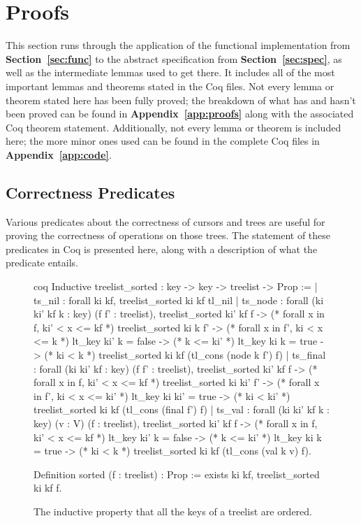 \documentclass[12pt]{article}
\begin{document}
\clearpage

\section{Proofs}
\label{sec:proofs}

This section runs through the application of the functional implementation from \textbf{Section~\ref{sec:func}} to the abstract specification from \textbf{Section~\ref{sec:spec}}, as well as the intermediate lemmas used to get there. It includes all of the most important lemmas and theorems stated in the Coq files. Not every lemma or theorem stated here has been fully proved; the breakdown of what has and hasn't been proved can be found in \textbf{Appendix~\ref{app:proofs}} along with the associated Coq theorem statement. Additionally, not every lemma or theorem is included here; the more minor ones used can be found in the complete Coq files in \textbf{Appendix~\ref{app:code}}.

\subsection{Correctness Predicates}

Various predicates about the correctness of cursors and trees are useful for proving the correctness of operations on those trees. The statement of these predicates in Coq is presented here, along with a description of what the predicate entails.

\begin{singlespace}
\begin{figure}[hpt]
\centering
\begin{cminted}{coq}
Inductive treelist_sorted : key -> key -> treelist -> Prop :=
| ts_nil : forall ki kf, treelist_sorted ki kf tl_nil
| ts_node : forall (ki ki' kf k : key) (f f' : treelist),
    treelist_sorted ki' kf f -> (* forall x in f, ki' < x <= kf *)
    treelist_sorted ki k f' -> (* forall x in f', ki < x <= k *)
    lt_key ki' k = false -> (* k <= ki' *)
    lt_key ki k = true -> (* ki < k *)
    treelist_sorted ki kf (tl_cons (node k f') f)
| ts_final : forall (ki ki' kf : key) (f f' : treelist),
    treelist_sorted ki' kf f -> (* forall x in f, ki' < x <= kf *)
    treelist_sorted ki ki' f' -> (* forall x in f', ki < x <= ki' *)
    lt_key ki ki' = true -> (* ki < ki' *)
    treelist_sorted ki kf (tl_cons (final f') f)
| ts_val : forall (ki ki' kf k : key) (v : V) (f : treelist),
    treelist_sorted ki' kf f -> (* forall x in f, ki' < x <= kf *)
    lt_key ki' k = false -> (* k <= ki' *)
    lt_key ki k = true -> (* ki < k *)
    treelist_sorted ki kf (tl_cons (val k v) f).

Definition sorted (f : treelist) : Prop :=
  exists ki kf, treelist_sorted ki kf f.
\end{cminted}
\caption{The inductive property that all the keys of a treelist are ordered.}
\label{fig:sorted}
\end{figure}
\end{singlespace}
\end{document}
